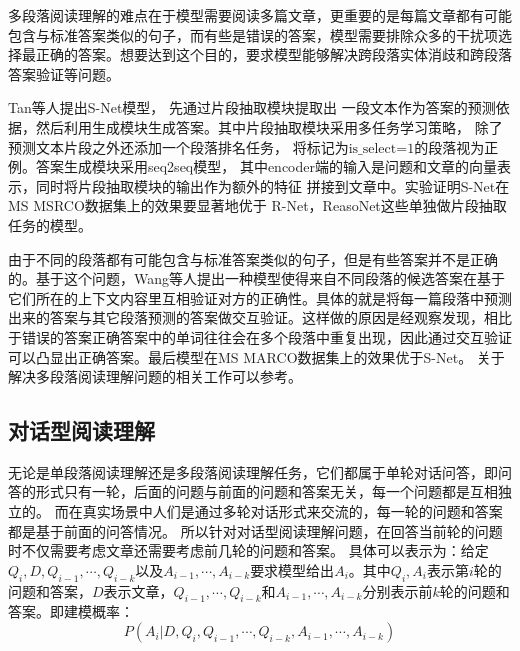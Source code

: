 多段落阅读理解的难点在于模型需要阅读多篇文章，更重要的是每篇文章都有可能包含与标准答案类似的句子，而有些是错误的答案，模型需要排除众多的干扰项选择最正确的答案。想要达到这个目的，要求模型能够解决跨段落实体消歧和跨段落答案验证等问题。

Tan等人提出S-Net模型，
先通过片段抽取模块提取出
一段文本作为答案的预测依据，然后利用生成模块生成答案。其中片段抽取模块采用多任务学习策略，
除了预测文本片段之外还添加一个段落排名任务，
将标记为$\text{is\_select=1}$的段落视为正例。答案生成模块采用seq2seq模型，
其中encoder端的输入是问题和文章的向量表示，同时将片段抽取模块的输出作为额外的特征
拼接到文章中。实验证明S-Net在MS MSRCO数据集上的效果要显著地优于
R-Net，ReasoNet这些单独做片段抽取任务的模型。

由于不同的段落都有可能包含与标准答案类似的句子，但是有些答案并不是正确的。基于这个问题，Wang等人提出一种模型使得来自不同段落的候选答案在基于它们所在的上下文内容里互相验证对方的正确性。具体的就是将每一篇段落中预测出来的答案与其它段落预测的答案做交互验证。这样做的原因是经观察发现，相比于错误的答案正确答案中的单词往往会在多个段落中重复出现，因此通过交互验证可以凸显出正确答案。最后模型在MS MARCO数据集上的效果优于S-Net。
关于解决多段落阅读理解问题的相关工作可以参考。

\subsection{对话型阅读理解}\label{cmrc}
%
%
无论是单段落阅读理解还是多段落阅读理解任务，它们都属于单轮对话问答，即问答的形式只有一轮，后面的问题与前面的问题和答案无关，每一个问题都是互相独立的。
而在真实场景中人们是通过多轮对话形式来交流的，每一轮的问题和答案都是基于前面的问答情况。
所以针对对话型阅读理解问题，在回答当前轮的问题时不仅需要考虑文章还需要考虑前几轮的问题和答案。
具体可以表示为：给定$Q_i,D,Q_{i-1},\cdots,Q_{i-k}$以及$A_{i-1},\cdots,A_{i-k}$要求模型给出$A_{i}$。其中$Q_i,A_i$表示第$i$轮的问题和答案，$D$表示文章，$Q_{i-1},\cdots,Q_{i-k}$和$A_{i-1},\cdots,A_{i-k}$分别表示前$k$轮的问题和答案。即建模概率：
\begin{equation}
P(A_i|D,Q_i,Q_{i-1},\cdots,Q_{i-k},A_{i-1},\cdots,A_{i-k})
\end{equation}

